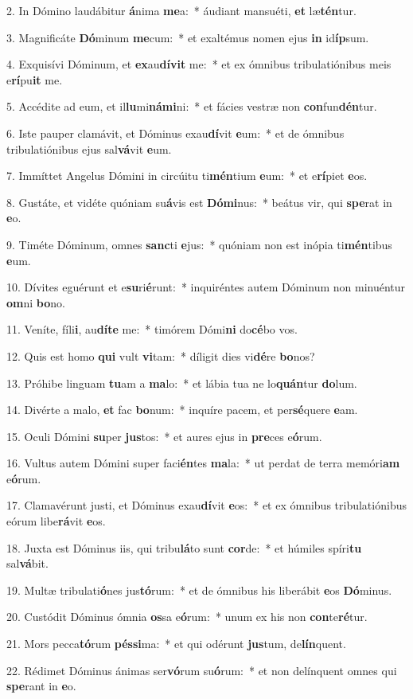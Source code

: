 2. In Dómino laudábitur \textbf{á}nima \textbf{me}a:~*  áudiant mansuéti, \textbf{et} læ\textbf{tén}tur.\

3. Magnificáte \textbf{Dó}minum \textbf{me}cum:~*  et exaltémus nomen ejus \textbf{in} id\textbf{íp}sum.\

4. Exquisívi Dóminum, et \textbf{ex}au\textbf{dí}\textbf{vit} me:~*  et ex ómnibus tribulatiónibus meis e\textbf{rí}pu\textbf{it} me.\

5. Accédite ad eum, et il\textbf{lu}mi\textbf{ná}\textbf{mi}ni:~*  et fácies vestræ non \textbf{con}fun\textbf{dén}tur.\

6. Iste pauper clamávit, et Dóminus exau\textbf{dí}vit \textbf{e}um:~*  et de ómnibus tribulatiónibus ejus sal\textbf{vá}vit \textbf{e}um.\

7. Immíttet Angelus Dómini in circúitu ti\textbf{mén}tium \textbf{e}um:~*  et e\textbf{rí}piet \textbf{e}os.\

8. Gustáte, et vidéte quóniam su\textbf{á}vis est \textbf{Dó}\textbf{mi}nus:~*  beátus vir, qui \textbf{spe}rat in \textbf{e}o.\

9. Timéte Dóminum, omnes \textbf{sanc}ti \textbf{e}jus:~*  quóniam non est inópia ti\textbf{mén}tibus \textbf{e}um.\

10. Dívites eguérunt et e\textbf{su}ri\textbf{é}runt:~*  inquiréntes autem Dóminum non minuéntur \textbf{om}ni \textbf{bo}no.\

11. Veníte, fíli\textbf{i}, au\textbf{dí}\textbf{te} me:~*  timórem Dómi\textbf{ni} do\textbf{cé}bo vos.\

12. Quis est homo \textbf{qui} vult \textbf{vi}tam:~*  díligit dies vi\textbf{dé}re \textbf{bo}nos?\

13. Próhibe linguam \textbf{tu}am a \textbf{ma}lo:~*  et lábia tua ne lo\textbf{quán}tur \textbf{do}lum.\

14. Divérte a malo, \textbf{et} fac \textbf{bo}num:~*  inquíre pacem, et per\textbf{sé}quere \textbf{e}am.\

15. Oculi Dómini \textbf{su}per \textbf{jus}tos:~*  et aures ejus in \textbf{pre}ces e\textbf{ó}rum.\

16. Vultus autem Dómini super faci\textbf{én}tes \textbf{ma}la:~*  ut perdat de terra memóri\textbf{am} e\textbf{ó}rum.\

17. Clamavérunt justi, et Dóminus exau\textbf{dí}vit \textbf{e}os:~*  et ex ómnibus tribulatiónibus eórum libe\textbf{rá}vit \textbf{e}os.\

18. Juxta est Dóminus iis, qui tribu\textbf{lá}to sunt \textbf{cor}de:~*  et húmiles spíri\textbf{tu} sal\textbf{vá}bit.\

19. Multæ tribulati\textbf{ó}nes jus\textbf{tó}rum:~*  et de ómnibus his liberábit \textbf{e}os \textbf{Dó}minus.\

20. Custódit Dóminus ómnia \textbf{os}sa e\textbf{ó}rum:~*  unum ex his non \textbf{con}te\textbf{ré}tur.\

21. Mors pecca\textbf{tó}rum \textbf{pés}\textbf{si}ma:~*  et qui odérunt \textbf{jus}tum, de\textbf{lín}quent.\

22. Rédimet Dóminus ánimas ser\textbf{vó}rum su\textbf{ó}rum:~*  et non delínquent omnes qui \textbf{spe}rant in \textbf{e}o.\

